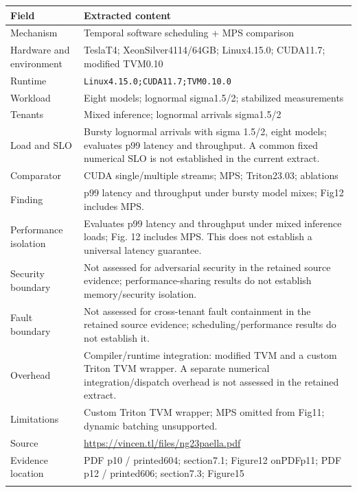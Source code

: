 \cite{P006}

\begin{longtable}{>{\raggedright\arraybackslash}p{}>{\raggedright\arraybackslash}p{}}
\toprule
\textbf{Field} & \textbf{Extracted content}\\\midrule\endhead
Mechanism & Temporal software scheduling + MPS comparison\\\addlinespace
Hardware and environment & TeslaT4; XeonSilver4114/64GB; Linux4.15.0; CUDA11.7; modified TVM0.10\\\addlinespace
Runtime & \nolinkurl{Linux4.15.0;CUDA11.7;TVM0.10.0}\\\addlinespace
Workload & Eight models; lognormal sigma1.5/2; stabilized measurements\\\addlinespace
Tenants & Mixed inference; lognormal arrivals sigma1.5/2\\\addlinespace
Load and SLO & Bursty lognormal arrivals with sigma 1.5/2, eight models; evaluates p99 latency and throughput. A common fixed numerical SLO is not established in the current extract.\\\addlinespace
Comparator & CUDA single/multiple streams; MPS; Triton23.03; ablations\\\addlinespace
Finding & p99 latency and throughput under bursty model mixes; Fig12 includes MPS.\\\addlinespace
Performance isolation & Evaluates p99 latency and throughput under mixed inference loads; Fig. 12 includes MPS. This does not establish a universal latency guarantee.\\\addlinespace
Security boundary & Not assessed for adversarial security in the retained source evidence; performance-sharing results do not establish memory/security isolation.\\\addlinespace
Fault boundary & Not assessed for cross-tenant fault containment in the retained source evidence; scheduling/performance results do not establish it.\\\addlinespace
Overhead & Compiler/runtime integration: modified TVM and a custom Triton TVM wrapper. A separate numerical integration/dispatch overhead is not assessed in the retained extract.\\\addlinespace
Limitations & Custom Triton TVM wrapper; MPS omitted from Fig11; dynamic batching unsupported.\\\addlinespace
Source & \url{https://vincen.tl/files/ng23paella.pdf}\\\addlinespace
Evidence location & PDF p10 / printed604; section7.1; Figure12 onPDFp11; PDF p12 / printed606; section7.3; Figure15\\\addlinespace
\bottomrule\end{longtable}


